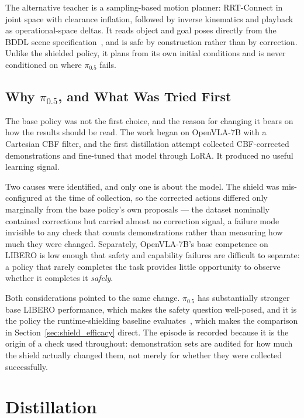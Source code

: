 \documentclass[a4paper,11pt]{report}
\begin{document}
The alternative teacher is a sampling-based motion planner: RRT-Connect in joint space with
clearance inflation, followed by inverse kinematics and playback as operational-space deltas. It
reads object and goal poses directly from the BDDL scene specification~\cite{liu2023libero}, and is
safe by construction rather than by correction. Unlike the shielded policy, it plans from its own
initial conditions and is never conditioned on where $\pi_{0.5}$ fails.

\subsection{Why \texorpdfstring{$\pi_{0.5}$}{pi 0.5}, and What Was Tried First}
\label{sec:base_choice}

The base policy was not the first choice, and the reason for changing it bears on how the results
should be read. The work began on OpenVLA-7B with a Cartesian CBF filter, and the first
distillation attempt collected CBF-corrected demonstrations and fine-tuned that model through LoRA.
It produced no useful learning signal.

Two causes were identified, and only one is about the model. The shield was mis-configured at the
time of collection, so the corrected actions differed only marginally from the base policy's own
proposals --- the dataset nominally contained corrections but carried almost no correction signal,
a failure mode invisible to any check that counts demonstrations rather than measuring how much
they were changed. Separately, OpenVLA-7B's base competence on LIBERO is low enough that safety and
capability failures are difficult to separate: a policy that rarely completes the task provides
little opportunity to observe whether it completes it \emph{safely}.

Both considerations pointed to the same change. $\pi_{0.5}$ has substantially stronger base LIBERO
performance, which makes the safety question well-posed, and it is the policy the runtime-shielding
baseline evaluates~\cite{vlsa2026}, which makes the comparison in
Section~\ref{sec:shield_efficacy} direct. The episode is recorded because it is the origin of a
check used throughout: demonstration sets are audited for how much the shield actually changed
them, not merely for whether they were collected successfully.

\section{Distillation}\label{sec:distillation}
\end{document}
